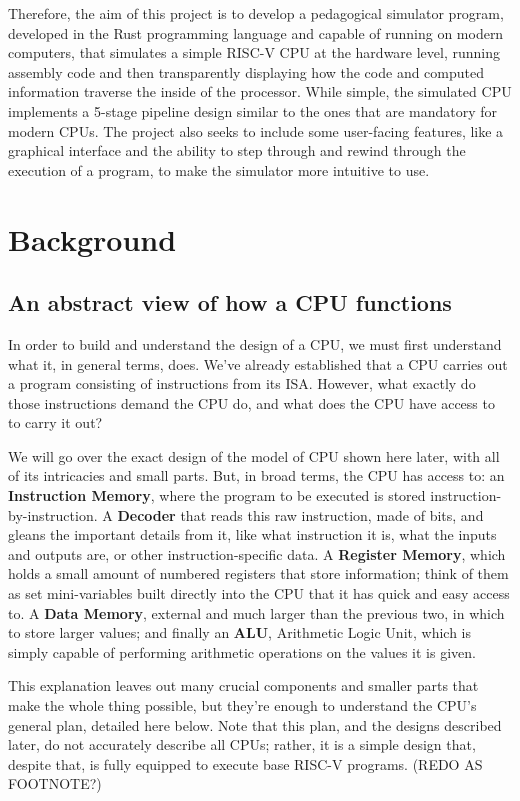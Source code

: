 \documentclass[12pt,twoside]{reedthesis}
\begin{document}
Therefore, the aim of this project is to develop a pedagogical simulator program, developed in the Rust programming language and capable of running on modern computers, that simulates a simple RISC-V CPU at the hardware level, running assembly code and then transparently displaying how the code and computed information traverse the inside of the processor. While simple, the simulated CPU implements a 5-stage pipeline design similar to the ones that are mandatory for modern CPUs. The project also seeks to include some user-facing features, like a graphical interface and the ability to step through and rewind through the execution of a program, to make the simulator more intuitive to use.

\chapter*{Background}
\section{An abstract view of how a CPU functions}
In order to build and understand the design of a CPU, we must first understand what it, in general terms, does. We've already established that a CPU carries out a program consisting of instructions from its ISA. However, what exactly do those instructions demand the CPU do, and what does the CPU have access to to carry it out?

We will go over the exact design of the model of CPU shown here later, with all of its intricacies and small parts. But, in broad terms, the CPU has access to: an \textbf{Instruction Memory}, where the program to be executed is stored instruction-by-instruction. A \textbf{Decoder} that reads this raw instruction, made of bits, and gleans the important details from it, like what instruction it is, what the inputs and outputs are, or other instruction-specific data. A \textbf{Register Memory}, which holds a small amount of numbered registers that store information; think of them as set mini-variables built directly into the CPU that it has quick and easy access to. A \textbf{Data Memory}, external and much larger than the previous two, in which to store larger values; and finally an \textbf{ALU}, Arithmetic Logic Unit, which is simply capable of performing arithmetic operations on the values it is given.

This explanation leaves out many crucial components and smaller parts that make the whole thing possible, but they're enough to understand the CPU's general plan, detailed here below. Note that this plan, and the designs described later, do not accurately describe all CPUs; rather, it is a simple design that, despite that, is fully equipped to execute base RISC-V programs. (REDO AS FOOTNOTE?)
\end{document}
